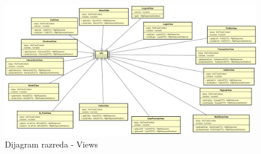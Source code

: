 		\begin{figure}[!h]
			\centering
			\includegraphics[width=1.1\linewidth, height=0.4\textheight]{slike/dijagram_razreda_1}
			\caption{Dijagram razreda - Views}
			\label{fig:dijagramrazreda1}
		\end{figure}
		
		
		
